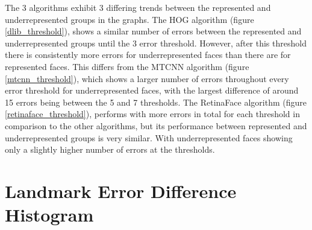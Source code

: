 \documentclass{l4proj}
\begin{document}
\begin{figure}[h!]
\end{figure}

The 3 algorithms exhibit 3 differing trends between the represented and underrepresented groups in the graphs. The HOG algorithm (figure \ref{dlib_threshold}), shows a similar number of errors between the represented and underrepresented groups until the 3 error threshold. However, after this threshold there is consistently more errors for underrepresented faces than there are for represented faces. This differs from the MTCNN algorithm (figure \ref{mtcnn_threshold}), which shows a larger number of errors throughout every error threshold for underrepresented faces, with the largest difference of around 15 errors being between the 5 and 7 thresholds. The RetinaFace algorithm (figure \ref{retinaface_threshold}), performs with more errors in total for each threshold in comparison to the other algorithms, but its performance between represented and underrepresented groups is very similar. With underrepresented faces showing only a slightly higher number of errors at the thresholds.

\section{Landmark Error Difference Histogram}
\end{document}
